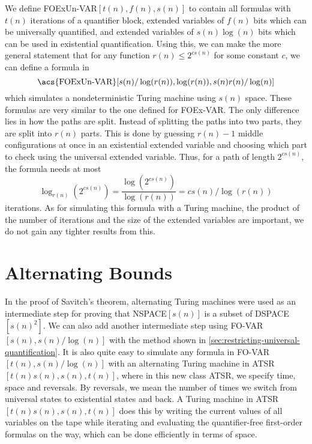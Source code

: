 We define \acs{FOExUn-VAR}$[t(n), f(n), s(n)]$ to contain all formulas with $t(n)$ iterations of a quantifier block, extended variables of $f(n)$ bits which can be universally quantified, and extended variables of $s(n)\log(n)$ bits which can be used in existential quantification.
Using this, we can make the more general statement that for any function $r(n) \leq 2^{cs(n)}$ for some constant $c$, we can define a formula in \[\text{\acs{FOExUn-VAR}$[s(n)/\log(r(n)), \log(r(n)), s(n)r(n)/\log(n)]$}\] which simulates a nondeterministic Turing machine using $s(n)$ space.
These formulas are very similar to the one defined for \acs{FOEx-VAR}\@.
The only difference lies in how the paths are split.
Instead of splitting the paths into two parts, they are split into $r(n)$ parts.
This is done by guessing $r(n) - 1$ middle configurations at once in an existential extended variable and choosing which part to check using the universal extended variable.
Thus, for a path of length $2^{cs(n)}$, the formula needs at most \[\log_{r(n)}\left(2^{cs(n)}\right) = \frac{\log\left(2^{cs(n)}\right)}{\log(r(n))} = cs(n)/\log(r(n))\] iterations.
As for simulating this formula with a Turing machine, the product of the number of iterations and the size of the extended variables are important, we do not gain any tighter results from this.


\section{Alternating Bounds}\label{sec:alternating-bounds}

In the proof of Savitch's theorem, alternating Turing machines were used as an intermediate step for proving that \acs{NSPACE}$[s(n)]$ is a subset of \acs{DSPACE}$[s(n)^2]$.
We can also add another intermediate step using \acs{FO-VAR}$[s(n), s(n)/\log(n)]$ with the method shown in \cref{sec:restricting-universal-quantification}.
It is also quite easy to simulate any formula in \acs{FO-VAR}$[t(n), s(n)/\log(n)]$ with an alternating Turing machine in \acs{ATSR}$[t(n)s(n), s(n), t(n)]$, where in this new class \acs{ATSR}, we specify time, space and reversals.
By reversals, we mean the number of times we switch from universal states to existential states and back.
A Turing machine in \acs{ATSR}$[t(n)s(n), s(n), t(n)]$ does this by writing the current values of all variables on the tape while iterating and evaluating the quantifier-free first-order formulas on the way, which can be done efficiently in terms of space.

